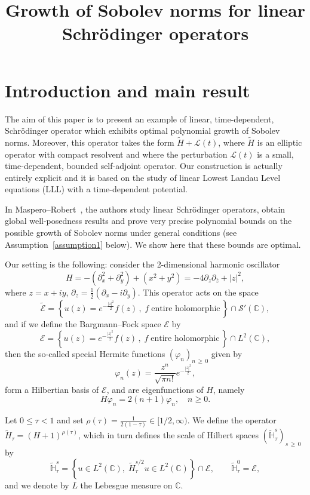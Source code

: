 \documentclass[AHL,Unicode,published]{cedram}
\title{Growth of Sobolev norms for linear Schr{\"o}dinger operators}
\author[\initial{L.} \lastname{Thomann}]{\firstname{Laurent} \lastname{Thomann}}
\newcommand{\C}{\mathbb{C}}
\newcommand{\HH}{\mathbb{H}}
\newcommand{\E}{\mathcal{E}}
\renewcommand{\L}{\mathscr{L}}
\newcommand{\crS}{\mathscr{S}}
\newcommand{\ov}{\overline}
\newcommand{\wt}{\widetilde}
\newcommand{\<}{\langle}
\renewcommand{\>}{\rangle}
\renewcommand{\phi}{\varphi}
\begin{document}
\maketitle

\pagebreak

\section{Introduction and main result}


The aim of this paper is to present an example of linear, time-dependent, Schr\"odin\-ger operator which exhibits optimal polynomial growth of Sobolev norms. Moreover, this operator takes the form $\wt{H}+\L(t)$, where $\wt{H}$ is an elliptic operator with compact resolvent and where the perturbation $\L(t)$ is a small, time-dependent, bounded self-adjoint operator. Our construction is actually entirely explicit and it is based on the study of linear Lowest Landau Level equations (LLL) with a time-dependent potential.



In Maspero--Robert~\cite{MasRo}, the authors study linear Schrödinger operators, obtain global well-posedness results and prove very precise polynomial bounds on the possible growth of Sobolev norms under general conditions (see Assumption~\ref{assumption1} below). We show here that these bounds are optimal.

Our setting is the following: consider the 2-dimensional harmonic oscillator
\[
H =-\left(\partial^2_x+\partial^2_y\right)+\left(x^2+y^2\right)= -4\partial_z \partial_{\ov z}+|z|^2,
\]
where $z=x+iy$, $\partial_z=\tfrac12(\partial_x-i\partial_y)$. This operator acts on the space
\[
\wt{\E} =\left\{ u(z) = e^{-\frac{|z|^2}{2}} f(z)\,,\;f \;
\text{entire holomorphic}\,\right\}\cap \crS'(\C),
\]
and if we define the Bargmann--Fock space $\E$ by
\[
\E =\left\{ u(z) = e^{-\frac{|z|^2}{2}} f(z)\,,\;f \; \text{entire holomorphic}\,\right\}\cap L^2(\C),
\]
then the so-called special Hermite functions $(\phi_n)_{n\,\geq\,0}$ given by
\[
\varphi_n(z) = \frac{z^n}{\sqrt{\pi n!}} e^{-\frac{|z|^2}{2}},
\]
form a Hilbertian basis of $\E$, and are eigenfunctions of $H$, namely
\[
H\phi_n=2(n+1)\phi_n, \quad n\geq 0.
\]


Let $0\leq \tau <1$ and set $\rho(\tau)=\frac1{2(1-\tau)} \in [1/2,\infty)$. We define the operator $\wt{H}_\tau=(H+1)^{\rho(\tau)}$, which in turn defines the scale of Hilbert spaces $(\widetilde{\HH}^{s}_\tau)_{s\,\geq\,0}$ by
\[
\widetilde{\HH}_\tau^{s} = \left\{ u\in L^2(\C),\; \wt{H}_\tau^{s/2}u\in L^2(\C)\right\} \cap \E,\qquad \widetilde{\HH}_\tau^{0} =\E,
\]
and we denote by $L$ the Lebesgue measure on $\C$.
\end{document}
